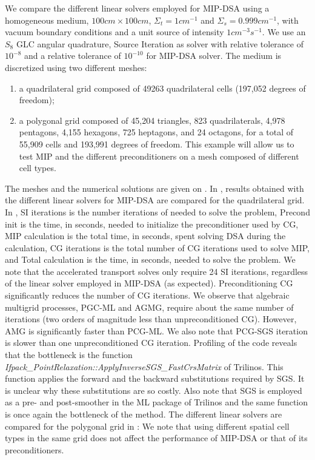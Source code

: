 We compare the different linear solvers employed for MIP-DSA using a homogeneous medium, $100cm
\times 100cm$, $\Sigma_t = 1cm^{-1}$ and $\Sigma_s = 0.999cm^{-1}$, with
vacuum boundary conditions and a unit source of intensity $1cm^{-3}s^{-1}$. We
use an $S_8$ GLC angular quadrature, Source Iteration as solver
with relative tolerance of $10^{-8}$ and a relative tolerance of
$10^{-10}$ for MIP-DSA solver. The medium is discretized using two different meshes:
\begin{enumerate}
  \item a quadrilateral grid composed of 49263 quadrilateral
    cells (197,052 degrees of freedom); 
  \item a polygonal grid composed of 45,204 triangles, 823
    quadrilaterals, 4,978 pentagons, 4,155 hexagons, 725 heptagons, and 24
    octagons, for a total of 55,909 cells and 193,991 degrees of freedom. This
    example will allow us to test MIP and the different preconditioners on a
    mesh composed of different cell types.
\end{enumerate}
%
The meshes and the numerical solutions are given on .
In , results obtained with the different linear solvers for MIP-DSA 
are compared for the quadrilateral grid.
In , SI iterations is the number iterations of 
needed to solve the problem, Precond init is the time, in
seconds, needed to initialize the preconditioner used by CG, MIP calculation
is the total time, in seconds, spent solving DSA during the calculation, CG
iterations is the total number of CG iterations used to solve MIP, and Total
calculation is the time, in seconds, needed to solve the problem. 
We note that the accelerated transport solves only require 24 SI iterations, regardless of the linear solver
employed in MIP-DSA (as expected). Preconditioning CG significantly reduces the number of CG iterations.
%
We observe that algebraic multigrid processes, PGC-ML and AGMG, require 
about the same number of iterations (two orders of magnitude less than unpreconditioned CG). 
However, AMG is significantly faster than PCG-ML. We also note that PCG-SGS iteration is 
slower than one unpreconditioned CG iteration. Profiling of the code reveals that the
bottleneck is the function \emph{Ifpack\_PointRelaxation::ApplyInverseSGS\_FastCrsMatrix} 
of Trilinos. This function applies the forward and the backward substitutions required by SGS.
It is unclear why these substitutions are so costly. Also note that SGS is employed as
a pre- and post-smoother in the ML package of Trilinos and the same function
is once again the bottleneck of the method.
%
The different linear solvers are compared for the polygonal grid in :
We note that using different spatial cell types in the same grid does not affect
the performance of MIP-DSA or that of its preconditioners.

